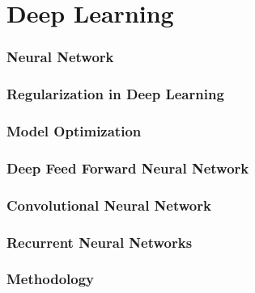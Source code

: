 \chapter{Deep Learning}

\subsection{Neural Network}

\subsection{Regularization in Deep Learning}

\subsection{Model Optimization}

\subsection{Deep Feed Forward Neural Network}

\subsection{Convolutional Neural Network}

\subsection{Recurrent Neural Networks}

\subsection{Methodology}
